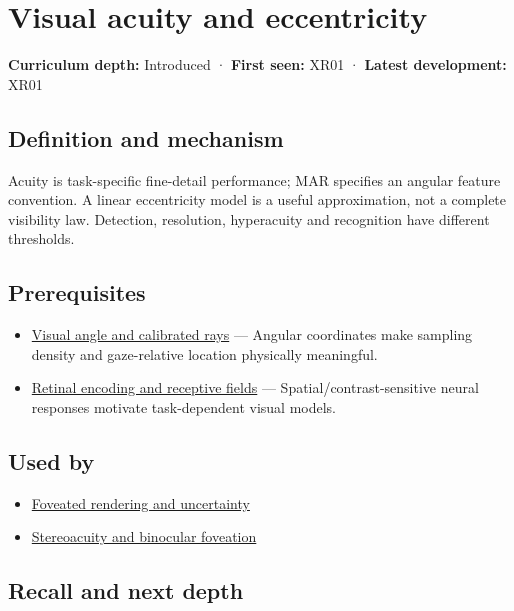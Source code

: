 \hypertarget{appendix-b491fc48c54b}{}
\section{Visual acuity and eccentricity}\label{appendix-b491fc48c54b-visual-acuity-and-eccentricity}

\textbf{Curriculum depth:} Introduced · \textbf{First seen:} XR01 · \textbf{Latest development:} XR01

\subsection{Definition and mechanism}\label{appendix-b491fc48c54b-definition-and-mechanism}

Acuity is task-specific fine-detail performance; MAR specifies an angular feature convention. A linear eccentricity model is a useful approximation, not a complete visibility law. Detection, resolution, hyperacuity and recognition have different thresholds.

\subsection{Prerequisites}\label{appendix-b491fc48c54b-prerequisites}

\begin{itemize}
\tightlist
\item
  \hyperref[appendix-7d356c396d1a]{Visual angle and calibrated rays} --- Angular coordinates make sampling density and gaze-relative location physically meaningful.
\item
  \hyperref[appendix-7281c15ac44a]{Retinal encoding and receptive fields} --- Spatial/contrast-sensitive neural responses motivate task-dependent visual models.
\end{itemize}

\subsection{Used by}\label{appendix-b491fc48c54b-used-by}

\begin{itemize}
\tightlist
\item
  \hyperref[appendix-5878b813b732]{Foveated rendering and uncertainty}
\item
  \hyperref[appendix-8dc848f14052]{Stereoacuity and binocular foveation}
\end{itemize}

\subsection{Recall and next depth}\label{appendix-b491fc48c54b-recall-and-next-depth}

